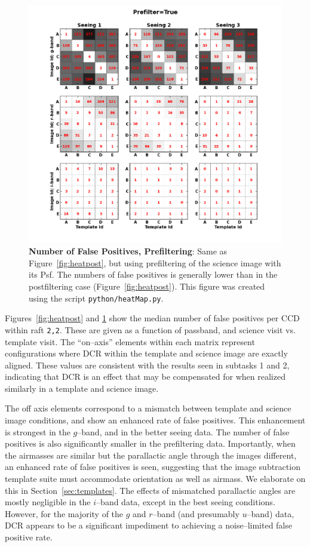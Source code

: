 \documentclass[DM,toc]{lsstdoc}
\begin{document}
\begin{figure}[!ht]
  \centering
  \includegraphics[width=1.0\textwidth]{heatmapTrue.png}
  \caption{{\bf Number of False Positives, Prefiltering}: Same as
    Figure~\ref{fig:heatpost}, but using prefiltering of the science
    image with its Psf.  The numbers of false positives is generally
    lower than in the postfiltering case (Figure~\ref{fig:heatpost}).
    This figure was created using the script {\tt python/heatMap.py}.}
  \label{fig:heatpre}
\end{figure}

Figures~\ref{fig:heatpost} and \ref{fig:heatpre} show the median
number of false positives per CCD within raft {\tt 2,2}.  These are
given as a function of passband, and science visit vs. template visit.
The ``on--axis'' elements within each matrix represent configurations
where DCR within the template and science image are exactly aligned.
These values are consistent with the results seen in subtasks 1 and 2,
indicating that DCR is an effect that may be compensated for when
realized similarly in a template and science image.

The off axis elements correspond to a mismatch between template and
science image conditions, and show an enhanced rate of false
positives.  This enhancement is strongest in the $g$--band, and in the
better seeing data.  The number of false positives is also
significantly smaller in the prefiltering data.  Importantly, when the
airmasses are similar but the parallactic angle through the images
different, an enhanced rate of false positives is seen, suggesting
that the image subtraction template suite must accommodate orientation
as well as airmass.  We elaborate on this in
Section~\ref{sec:templates}.  The effects of mismatched parallactic
angles are mostly negligible in the $i$--band data, except in the best
seeing conditions.  However, for the majority of the $g$ and $r$--band
(and presumably $u$--band) data, DCR appears to be a significant
impediment to achieving a noise--limited false positive rate.
\end{document}
